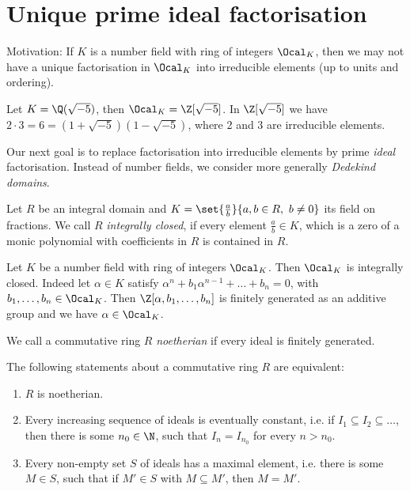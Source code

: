 \section{Unique prime ideal factorisation}

Motivation: If \( K \) is a number field with ring of integers \( \Ocal_K \), then we may not have a unique factorisation in \( \Ocal_K \) into irreducible elements (up to units and ordering).

\begin{exmp*}
	Let \( K = \Q(\sqrt{-5}) \), then \( \Ocal_K = \Z[\sqrt{-5}] \).
	In \( \Z[\sqrt{-5}] \) we have \( 2 \cdot 3 = 6 = (1+\sqrt{-5})(1-\sqrt{-5}) \), where 2 and 3 are irreducible elements.
\end{exmp*}

Our next goal is to replace factorisation into irreducible elements by prime \emph{ideal} factorisation.
Instead of number fields, we consider more generally \emph{Dedekind domains}.

\begin{defn*}
	Let \( R \) be an integral domain and \( K = \set{\frac{a}{b}}{a,b \in R,\ b \neq 0} \) its field on fractions.
	We call \( R \) \emph{integrally closed}, if every element \( \frac{a}{b} \in K \), which is a zero of a monic polynomial with coefficients in \( R \) is contained in \( R \).
\end{defn*}

\begin{exmp*}
	Let \( K \) be a number field with ring of integers \( \Ocal_K \).
	Then \( \Ocal_K \) is integrally closed.
	Indeed let \( \alpha \in K \) satisfy \( \alpha^n + b_1\alpha^{n-1} + \dots + b_n = 0 \), with \( b_1, \dotsc, b_n \in \Ocal_K \).
	Then \( \Z[\alpha, b_1, \dotsc, b_n] \) is finitely generated as an additive group and we have \( \alpha \in \Ocal_K \).
\end{exmp*}

\begin{defn*}
	We call a commutative ring \( R \) \emph{noetherian} if every ideal is finitely generated.
\end{defn*}

\begin{rem*}
	The following statements about a commutative ring \( R \) are equivalent:
	\begin{enumerate}
		\item \( R \) is noetherian.
		\item Every increasing sequence of ideals is eventually constant, i.e. if \( I_1 \subseteq I_2 \subseteq \dots \), then there is some \( n_0 \in \N \), such that \( I_n = I_{n_0} \) for every \( n > n_0 \).
		\item Every non-empty set \( S \) of ideals has a maximal element, i.e. there is some \( M \in S \), such that if \( M' \in S \) with \( M \subseteq M' \), then \( M = M' \).
	\end{enumerate}
\end{rem*}

